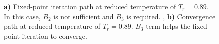 \documentclass[5p,times]{elsarticle}
\begin{document}
\begin{figure}
\centering
{}
\caption{
\textbf{a)} Fixed-point iteration path at reduced temperature of $T_r=0.89$. In this case, $B_2$ is not sufficient and $B_3$ is required.
, \textbf{b)} Convergence path at reduced temperature of $T_r=0.89$. $B_3$ term helps the fixed-point iteration to converge.
}
\label{fig:B3-helps-convergence}
\end{figure}
\end{document}
